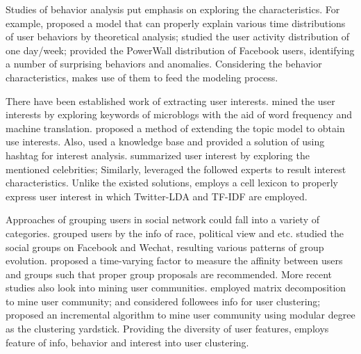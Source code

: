 Studies of behavior analysis put emphasis on exploring the characteristics.
For example, \cite{IEEEexample:jiang2013understanding} proposed a model that can properly explain various time distributions of user behaviors by theoretical analysis;
\cite{IEEEexample:conf/music/GuoLTL12} studied the user activity distribution of one day/week;
\cite{IEEEexample:journals/snam/DevineniKFF17} provided the PowerWall distribution of Facebook users, identifying a number of surprising behaviors and anomalies.
Considering the behavior characteristics, \sys{} makes use of them to feed the modeling process.

There have been established work of extracting user interests.
\cite{IEEEexample:journals/fcsc/LiuCS12} mined the user interests by exploring keywords of microblogs with the aid of word frequency and machine translation.
\cite{IEEEexample:conf/webi/XuLXY11} proposed a method of extending the topic model to obtain use interests.
Also, \cite{IEEEexample:conf/and/MichelsonM10} used a knowledge base and \cite{IEEEexample:conf/icde/FengW14} provided a solution of using hashtag for interest analysis.
\cite{IEEEexample:conf/wikis/LimD13} summarized user interest by exploring the mentioned celebrities;
Similarly, \cite{IEEEexample:conf/recsys/BhattacharyaZGGG14} leveraged the followed experts to result interest characteristics.
Unlike the existed solutions, \sys{} employs a cell lexicon to properly express user interest in which Twitter-LDA \cite{IEEEexample:zhao2011comparing} and TF-IDF are employed.

Approaches of grouping users in social network could fall into a variety of categories.
\cite{IEEEexample:conf/icwsm/PennacchiottiP11} grouped users by the info of race, political view and etc.
\cite{IEEEexample:journals/tkdd/ZhangCFLYZY17} studied the social groups on Facebook and Wechat, resulting various patterns of group evolution.
\cite{IEEEexample:conf/aaai/WangDNGEB16} proposed a time-varying factor to measure the affinity between users and groups such that proper group proposals are recommended.
More recent studies also look into mining user communities.
\cite{IEEEexample:conf/wsdm/YangL13} employed matrix decomposition to mine user community;
\cite{IEEEexample:conf/www/RuanFP13} and \cite{IEEEexample:he2014overlapping} considered followees info for user clustering;
\cite{IEEEexample:conf/aaai/ShiokawaFO13} proposed an incremental algorithm to mine user community using modular degree as the clustering yardstick.
Providing the diversity of user features, \sys{} employs feature of info, behavior and interest into user clustering.

